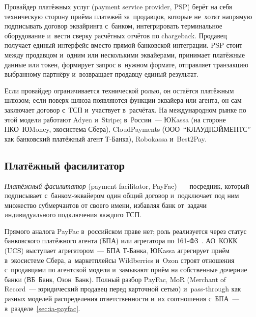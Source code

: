 Провайдер платёжных услуг (payment service provider, PSP) берёт на себя
техническую сторону приёма платежей за~продавцов, которые не~хотят напрямую
подписывать договор эквайринга с~банком, интегрировать терминальное
оборудование и~вести сверку расчётных отчётов по chargeback. Продавец получает
единый интерфейс вместо прямой банковской интеграции. PSP стоит между продавцом и~одним или несколькими эквайерами,
принимает платёжные данные или токен, формирует запрос в~нужном формате,
отправляет транзакцию выбранному партнёру и~возвращает продавцу единый
результат.

Если провайдер ограничивается технической ролью, он остаётся платёжным шлюзом;
если поверх шлюза появляются функции эквайера или агента, он сам заключает
договор с~ТСП и~участвует в~расчётах. На международном рынке по этой модели
работают Adyen и~Stripe; в~России~--- ЮKassa (на стороне НКО~ЮMoney, экосистема
Сбера), CloudPayments (ООО~\enquote{КЛАУДПЭЙМЕНТС} как банковский платёжный
агент Т-Банка), Robokassa и~Best2Pay.

\subsection*{Платёжный фасилитатор}

\textit{Платёжный фасилитатор} (payment facilitator, PayFac)~--- посредник,
который подписывает с~банком-эквайером один общий договор и~подключает под ним
множество субмерчантов от своего имени, избавляя банк от~задачи индивидуального
подключения каждого ТСП.

Прямого аналога PayFac в~российском праве нет; роль реализуется через статус
банковского платёжного агента (БПА) или агрегатора по 161-ФЗ~\cite{fz-161}.
АО~КОКК (UCS) выступает агрегатором~--- БПА Т-Банка, ЮKassa агрегирует приём
в~экосистеме Сбера, а~маркетплейсы Wildberries и~Ozon строят отношения
с~продавцами по агентской модели и~замыкают приём на собственные дочерние банки
(ВБ~Банк, Озон~Банк). Полный разбор PayFac, MoR (Merchant of Record~---
юридический продавец перед карточной сетью) и~pass-through как разных моделей
распределения ответственности и~их соотношения с~БПА~---
в~разделе~\ref{sec:ia-payfac}.

